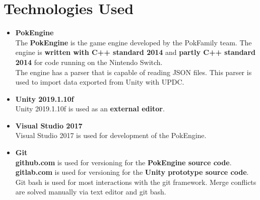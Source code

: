 \documentclass[12pt,a4paper]{article}
\begin{document}
\section{Technologies Used}
\begin{itemize}
	\item \textbf{PokEngine}\\
		The \textbf{PokEngine} is the game engine developed by the PokFamily team. The engine is \textbf{written with C++ standard 2014} and \textbf{partly C++ standard 2014} for code running on the Nintendo Switch.\\
The engine has a parser that is capable of reading JSON files. This parser is used to import data exported from Unity with UPDC.

	\item \textbf{Unity 2019.1.10f}\\
		Unity 2019.1.10f is used as an \textbf{external editor}.
	
	\item \textbf{Visual Studio 2017}\\
		Visual Studio 2017 is used for development of the PokEngine.
	
	\item \textbf{Git}\\
		\textbf{github.com} is used for versioning for the \textbf{PokEngine source code}. \textbf{gitlab.com} is used for versioning for the \textbf{Unity prototype source code}. Git bash is used for most interactions with the git framework. Merge conflicts are solved manually via text editor and git bash.		
\end{itemize}
\end{document}
